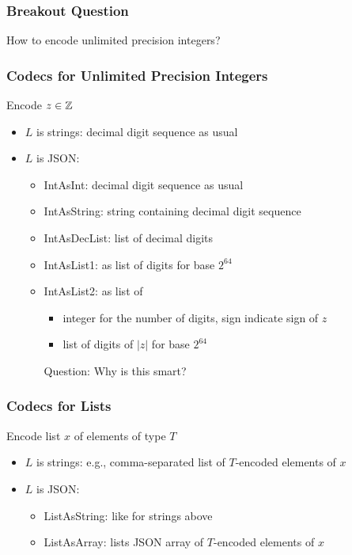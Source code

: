 \documentclass{beamer}
\begin{document}
\begin{frame}\frametitle{Breakout Question}
How to encode unlimited precision integers?
\end{frame}

\begin{frame}\frametitle{Codecs for Unlimited Precision Integers}
Encode $z\in\mathbb{Z}$
\begin{itemize}
\item $L$ is strings: decimal digit sequence as usual
\item $L$ is JSON:
 \begin{itemize}
 \item IntAsInt: decimal digit sequence as usual
 \item IntAsString: string containing decimal digit sequence
 \item IntAsDecList: list of decimal digits
 \item IntAsList1: as list of digits for base $2^{64}$
 \item IntAsList2: as list of
   \begin{itemize}
   \item integer for the number of digits, sign indicate sign of $z$
   \item list of digits of $|z|$ for base $2^{64}$
   \end{itemize}
   Question: Why is this smart?
   
 \end{itemize}
\end{itemize}
\end{frame}

\begin{frame}\frametitle{Codecs for Lists}
Encode list $x$ of elements of type $T$
\begin{itemize}
\item $L$ is strings: e.g., comma-separated list of $T$-encoded elements of $x$
\item $L$ is JSON:
 \begin{itemize}
 \item ListAsString: like for strings above
 \item ListAsArray: lists JSON array of $T$-encoded elements of $x$
 \end{itemize}
\end{itemize}
\end{frame}
\end{document}
